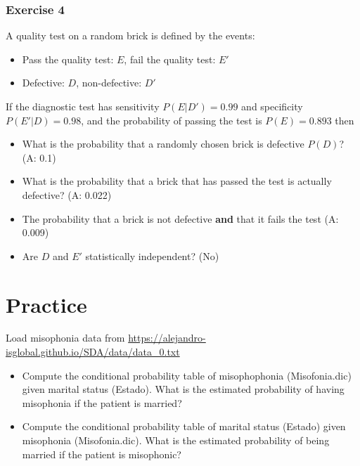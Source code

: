 \documentclass[
]{book}
\providecommand{\tightlist}{%
  \setlength{\itemsep}{0pt}\setlength{\parskip}{0pt}}
\begin{document}
\hypertarget{exercise-4}{%
\subsubsection{Exercise 4}\label{exercise-4}}

A quality test on a random brick is defined by the events:

\begin{itemize}
\tightlist
\item
  Pass the quality test: \(E\), fail the quality test: \(E'\)
\item
  Defective: \(D\), non-defective: \(D'\)
\end{itemize}

If the diagnostic test has sensitivity \(P(E|D')= 0.99\) and specificity \(P(E'|D)=0.98\), and the probability of passing the test is \(P(E) =0.893\) then

\begin{itemize}
\item
  What is the probability that a randomly chosen brick is defective \(P(D)\)? (A: 0.1)
\item
  What is the probability that a brick that has passed the test is actually defective? (A: 0.022)
\item
  The probability that a brick is not defective \textbf{and} that it fails the test (A: 0.009)
\item
  Are \(D\) and \(E'\) statistically independent? (No)
\end{itemize}

\hypertarget{practice-2}{%
\section{Practice}\label{practice-2}}

Load misophonia data from \url{https://alejandro-isglobal.github.io/SDA/data/data_0.txt}

\begin{itemize}
\item
  Compute the conditional probability table of misophophonia (Misofonia.dic) given marital status (Estado). What is the estimated probability of having misophonia if the patient is married?
\item
  Compute the conditional probability table of marital status (Estado) given misophonia (Misofonia.dic). What is the estimated probability of being married if the patient is misophonic?
\end{itemize}
\end{document}

